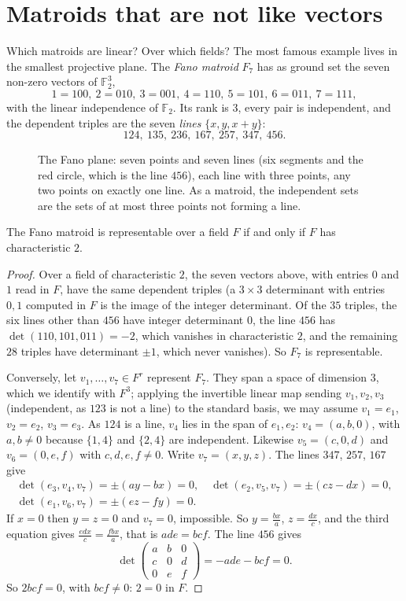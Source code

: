 \section{Matroids that are not like vectors}

Which matroids are linear? Over which fields? The most famous example lives in the smallest projective plane. The \emph{Fano matroid} $F_7$ has as ground set the seven non-zero vectors of $\mathbb F_2^3$,
\[
1=100,\ 2=010,\ 3=001,\ 4=110,\ 5=101,\ 6=011,\ 7=111,
\]
with the linear independence of $\mathbb F_2$. Its rank is $3$, every pair is independent, and the dependent triples are the seven \emph{lines} $\{x,y,x+y\}$:
\[
124,\ 135,\ 236,\ 167,\ 257,\ 347,\ 456.
\]

\begin{figure}[ht]
\centering
{}
\caption{The Fano plane: seven points and seven lines (six segments and the red circle, which is the line $456$), each line with three points, any two points on exactly one line. As a matroid, the independent sets are the sets of at most three
points not forming a line.}
\label{fig:fano}
\end{figure}

\begin{theorem}\label{thm:fano}
The Fano matroid is representable over a field $F$ if and only if $F$ has characteristic $2$.
\end{theorem}
\begin{proof}
Over a field of characteristic $2$, the seven vectors above, with entries $0$ and $1$ read in $F$, have the same dependent triples (a $3\times3$ determinant with entries $0,1$ computed in $F$ is the image of the integer determinant. Of the $35$ triples, the six lines other than $456$ have integer determinant $0$, the line $456$ has $\det(110,101,011)=-2$, which vanishes in characteristic $2$, and the remaining $28$ triples have determinant $\pm1$, which never vanishes). So $F_7$ is representable.

Conversely, let $v_1,\dots,v_7\in F^r$ represent $F_7$. They span a space of dimension $3$, which we identify with $F^3$; applying the invertible linear map sending $v_1,v_2,v_3$ (independent, as $123$ is not a line) to
the standard basis, we may assume $v_1=e_1$, $v_2=e_2$, $v_3=e_3$. As $124$ is a line, $v_4$ lies in the span of $e_1,e_2$: $v_4=(a,b,0)$, with $a,b\ne0$ because $\{1,4\}$ and $\{2,4\}$ are independent. Likewise
$v_5=(c,0,d)$ and $v_6=(0,e,f)$ with $c,d,e,f\ne0$. Write $v_7=(x,y,z)$. The lines $347$, $257$, $167$ give
\[
\begin{gathered}\det(e_3,v_4,v_7)=\pm(ay-bx)=0,\quad\det(e_2,v_5,v_7)=\pm(cz-dx)=0,\\\det(e_1,v_6,v_7)=\pm(ez-fy)=0.\end{gathered}
\]
If $x=0$ then $y=z=0$ and $v_7=0$, impossible. So $y=\frac{bx}a$, $z=\frac{dx}c$, and the third equation gives $\frac{edx}c=\frac{fbx}a$, that is $ade=bcf$. The line $456$ gives
\[
\det\begin{pmatrix}a&b&0\\c&0&d\\0&e&f\end{pmatrix}=-ade-bcf=0.
\]
So $2bcf=0$, with $bcf\ne0$: $2=0$ in $F$.
\end{proof}

